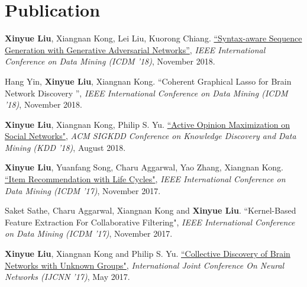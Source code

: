 \documentclass[a4paper,10pt]{article} %
\begin{document}
    \section{Publication}
    \begin{enumerate}[label=(C\arabic*).]
        {\item \label{treegan} 
        \textbf{{Xinyue Liu}}, Xiangnan Kong, Lei Liu, Kuorong Chiang. 
        \href{https://arxiv.org/abs/1808.07582}{
        ``Syntax-aware Sequence Generation with Generative Adversarial Networks''},
        \emph{IEEE International Conference on Data Mining (ICDM '18)}, November 2018.
        }
        
        {\item \label{CGL}
        Hang Yin, \textbf{{Xinyue Liu}}, Xiangnan Kong. 
        ``Coherent Graphical Lasso for Brain Network Discovery '', 
        \emph{IEEE International Conference on Data Mining (ICDM '18)}, November 2018.
        }
        
        \item \label{kdd18} 
        \textbf{{Xinyue Liu}}, Xiangnan Kong, Philip S. Yu. 
        \href{http://cinv.ro/files/KDD18.pdf}
        {``Active Opinion Maximization on Social Networks"}, 
        \emph{ACM SIGKDD Conference on Knowledge Discovery and Data Mining (KDD '18)}, August 2018.
                            
        \item \label{icdm17a} 
        \textbf{{Xinyue Liu}}, Yuanfang Song, Charu Aggarwal, Yao Zhang, Xiangnan Kong. 
        \href{http://cinv.ro/files/ICDM17.pdf}
        {``Item Recommendation with Life Cycles"}, 
        \emph{IEEE International Conference on Data Mining (ICDM '17)}, November 2017.                 
        
        \item \label{icdm17b} 
        Saket Sathe, Charu Aggarwal, Xiangnan Kong and \textbf{{Xinyue Liu}}. 
         ``Kernel-Based Feature Extraction For Collaborative Filtering", 
         \emph{IEEE International Conference on Data Mining (ICDM '17)}, November 2017.
                              
        \item \label{ijcnn17} 
        \textbf{{Xinyue Liu}}, Xiangnan Kong and Philip S. Yu. 
         \href{http://cinv.ro/files/IJCNN17.pdf}
         {``Collective Discovery of Brain Networks with Unknown Groups"}, 
         \emph{International Joint Conference On Neural Networks (IJCNN '17)}, May 2017.
                                  

\end{enumerate}
\end{document}
